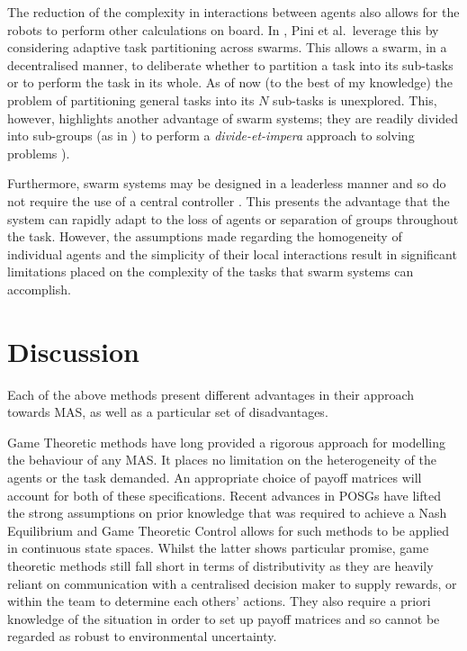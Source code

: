\documentclass[.../main.tex]{subfiles}
\begin{document}


The reduction of the complexity in interactions between agents also
allows for the robots to perform other calculations on board. In
\cite{Pini2011TaskSelection}, Pini et al.~leverage this by considering
adaptive task partitioning across swarms. This allows a swarm, in a
decentralised manner, to deliberate whether to partition a task into
its sub-tasks or to perform the task in its whole. As of now (to the
best of my knowledge) the problem of partitioning general tasks into
its $N$ sub-tasks is unexplored. This, however, highlights another
advantage of swarm systems; they are readily divided into sub-groups
(as in \cite{Zahadat2016DivisionInhibition}) to perform a
{\em divide-et-impera}
approach to solving problems
\cite{Pini2011TaskSelection}).

Furthermore, swarm systems may be designed in a leaderless manner and
so do not require the use of a central controller
\cite{Couceiro2015}. This presents the advantage that the system can
rapidly adapt to the loss of agents or separation of groups throughout
the task. However, the assumptions made regarding the homogeneity of
individual agents and the simplicity of their local interactions
result in significant limitations placed on the complexity of the
tasks that swarm systems can accomplish.


\section{Discussion} \label{sec:remarks}

Each of the above methods present different advantages in their
approach towards MAS, as well as a particular set of disadvantages.

Game Theoretic methods have long provided a rigorous approach for
modelling the behaviour of any MAS. It places no limitation on the
heterogeneity of the agents or the task demanded. An appropriate
choice of payoff matrices will account for both of these
specifications. Recent advances in POSGs have lifted the strong
assumptions on prior knowledge that was required to achieve a Nash
Equilibrium and Game Theoretic Control allows for such methods to be
applied in continuous state spaces. Whilst the latter shows particular
promise, game theoretic methods still fall short in terms of
distributivity as they are heavily reliant on communication with a
centralised decision maker to supply rewards, or within the team to
determine each others' actions. They also require a priori knowledge
of the situation in order to set up payoff matrices and so cannot be
regarded as robust to environmental uncertainty.
\end{document}
